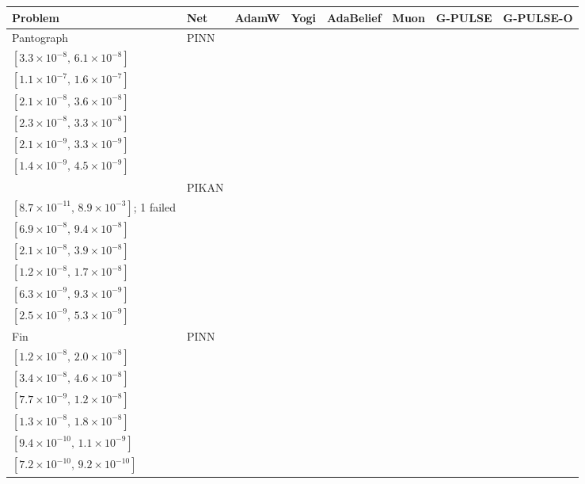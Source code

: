 \begin{tabular}{llcccccc}
\toprule
Problem & Net & AdamW & Yogi & AdaBelief & Muon & G-PULSE & G-PULSE-O\\
\midrule
Pantograph & PINN & \makecell{$4.5{\times}10^{-8}$\\{\scriptsize$[3.3{\times}10^{-8},\,6.1{\times}10^{-8}]$}} & \makecell{$1.3{\times}10^{-7}$\\{\scriptsize$[1.1{\times}10^{-7},\,1.6{\times}10^{-7}]$}} & \makecell{$2.8{\times}10^{-8}$\\{\scriptsize$[2.1{\times}10^{-8},\,3.6{\times}10^{-8}]$}} & \makecell{$2.8{\times}10^{-8}$\\{\scriptsize$[2.3{\times}10^{-8},\,3.3{\times}10^{-8}]$}} & \makecell{$2.6{\times}10^{-9}$\\{\scriptsize$[2.1{\times}10^{-9},\,3.3{\times}10^{-9}]$}} & \makecell{$\mathbf{2.5{\times}10^{-9}}$\\{\scriptsize$[1.4{\times}10^{-9},\,4.5{\times}10^{-9}]$}}\\
 & PIKAN & \makecell{$8.8{\times}10^{-7}$\\{\scriptsize$[8.7{\times}10^{-11},\,8.9{\times}10^{-3}]$; 1 failed}} & \makecell{$8.0{\times}10^{-8}$\\{\scriptsize$[6.9{\times}10^{-8},\,9.4{\times}10^{-8}]$}} & \makecell{$2.8{\times}10^{-8}$\\{\scriptsize$[2.1{\times}10^{-8},\,3.9{\times}10^{-8}]$}} & \makecell{$1.4{\times}10^{-8}$\\{\scriptsize$[1.2{\times}10^{-8},\,1.7{\times}10^{-8}]$}} & \makecell{$7.7{\times}10^{-9}$\\{\scriptsize$[6.3{\times}10^{-9},\,9.3{\times}10^{-9}]$}} & \makecell{$\mathbf{3.6{\times}10^{-9}}$\\{\scriptsize$[2.5{\times}10^{-9},\,5.3{\times}10^{-9}]$}}\\
\addlinespace
Fin & PINN & \makecell{$1.6{\times}10^{-8}$\\{\scriptsize$[1.2{\times}10^{-8},\,2.0{\times}10^{-8}]$}} & \makecell{$4.0{\times}10^{-8}$\\{\scriptsize$[3.4{\times}10^{-8},\,4.6{\times}10^{-8}]$}} & \makecell{$9.5{\times}10^{-9}$\\{\scriptsize$[7.7{\times}10^{-9},\,1.2{\times}10^{-8}]$}} & \makecell{$1.5{\times}10^{-8}$\\{\scriptsize$[1.3{\times}10^{-8},\,1.8{\times}10^{-8}]$}} & \makecell{$1.0{\times}10^{-9}$\\{\scriptsize$[9.4{\times}10^{-10},\,1.1{\times}10^{-9}]$}} & \makecell{$\mathbf{8.1{\times}10^{-10}}$\\{\scriptsize$[7.2{\times}10^{-10},\,9.2{\times}10^{-10}]$}}\\

\end{tabular}
